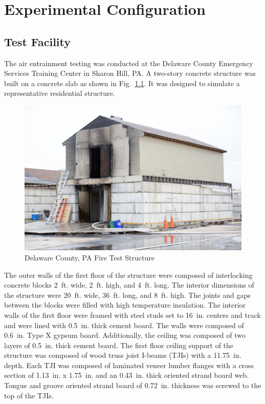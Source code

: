 \documentclass[12pt,oneside]{book}
\begin{document}
\clearpage

\chapter{Experimental Configuration}

\section{Test Facility}

The air entrainment testing was conducted at the Delaware County Emergency Services Training Center in Sharon Hill, PA. A two-story concrete structure was built on a concrete slab as shown in Fig.~\ref{fig:Delaware_County,_PA_Fire_Test_Structure}. It was designed to simulate a representative residential structure. 

\begin{figure}[!ht]
	\centering
	\includegraphics[width=\columnwidth]{Figures/Air_Entrainment/delcocorner.jpg}
	\caption{Delaware County, PA Fire Test Structure}
	\label{fig:Delaware_County,_PA_Fire_Test_Structure}
\end{figure}

The outer walls of the first floor of the structure were composed of interlocking concrete blocks 2~ft. wide, 2~ft. high, and 4~ft. long. The interior dimensions of the structure were 20~ft. wide, 36~ft. long, and 8~ft. high. The joints and gaps between the blocks were filled with high temperature insulation. The interior walls of the first floor were framed with steel studs set to 16~in. centers and track and were lined with 0.5~in. thick cement board. The walls were composed of 0.6~in. Type X gypsum board. Additionally, the ceiling was composed of two layers of 0.5~in. thick cement board. The first floor ceiling support of the structure was composed of wood truss joist I-beams (TJIs) with a 11.75~in. depth. Each TJI was composed of laminated veneer lumber flanges with a cross section of 1.13~in. x 1.75~in. and an 0.43~in. thick oriented strand board web. Tongue and groove oriented strand board of 0.72~in. thickness was screwed to the top of the TJIs. 
\end{document}
